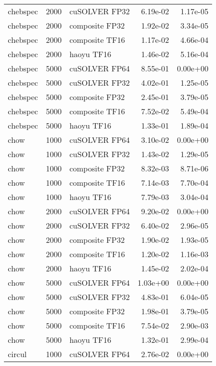 \begin{table}
\begin{tabular}{lrlrr}
 chebspec &  2000 &  cuSOLVER FP32 &  6.19e-02 &        1.17e-05 \\
 chebspec &  2000 & composite FP32 &  1.92e-02 &        3.34e-05 \\
 chebspec &  2000 & composite TF16 &  1.17e-02 &        4.66e-04 \\
 chebspec &  2000 &     haoyu TF16 &  1.46e-02 &        5.16e-04 \\
 chebspec &  5000 &  cuSOLVER FP64 &  8.55e-01 &        0.00e+00 \\
 chebspec &  5000 &  cuSOLVER FP32 &  4.02e-01 &        1.25e-05 \\
 chebspec &  5000 & composite FP32 &  2.45e-01 &        3.79e-05 \\
 chebspec &  5000 & composite TF16 &  7.52e-02 &        5.49e-04 \\
 chebspec &  5000 &     haoyu TF16 &  1.33e-01 &        1.89e-04 \\
     chow &  1000 &  cuSOLVER FP64 &  3.10e-02 &        0.00e+00 \\
     chow &  1000 &  cuSOLVER FP32 &  1.43e-02 &        1.29e-05 \\
     chow &  1000 & composite FP32 &  8.32e-03 &        8.71e-06 \\
     chow &  1000 & composite TF16 &  7.14e-03 &        7.70e-04 \\
     chow &  1000 &     haoyu TF16 &  7.79e-03 &        3.04e-04 \\
     chow &  2000 &  cuSOLVER FP64 &  9.20e-02 &        0.00e+00 \\
     chow &  2000 &  cuSOLVER FP32 &  6.40e-02 &        2.96e-05 \\
     chow &  2000 & composite FP32 &  1.90e-02 &        1.93e-05 \\
     chow &  2000 & composite TF16 &  1.20e-02 &        1.16e-03 \\
     chow &  2000 &     haoyu TF16 &  1.45e-02 &        2.02e-04 \\
     chow &  5000 &  cuSOLVER FP64 &  1.03e+00 &        0.00e+00 \\
     chow &  5000 &  cuSOLVER FP32 &  4.83e-01 &        6.04e-05 \\
     chow &  5000 & composite FP32 &  1.98e-01 &        3.79e-05 \\
     chow &  5000 & composite TF16 &  7.54e-02 &        2.90e-03 \\
     chow &  5000 &     haoyu TF16 &  1.32e-01 &        2.99e-04 \\
   circul &  1000 &  cuSOLVER FP64 &  2.76e-02 &        0.00e+00 \\

\end{tabular}
\end{table}
